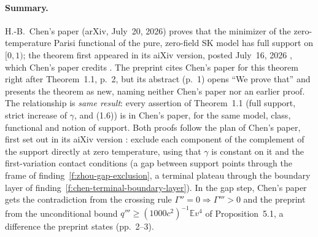 \documentclass[11pt]{article}
\newcommand{\E}{\mathbb{E}}
\newcommand{\ploc}[2]{#1}
\newcommand{\sloc}[2]{\cite[#2]{#1}}
\newcommand{\rel}[1]{\textit{#1}}
\newcounter{finding}
\begin{document}
\paragraph{Summary.}
H.-B.~Chen's paper \sloc{Chen2026-FRSBFullIntervalSupportZeroTemp}{Thm~1.3,
p.~3} (arXiv, July~20, 2026) proves that the minimizer of the
zero-temperature Parisi functional of the pure, zero-field SK model has full
support on $[0,1)$; the theorem first appeared in its aiXiv version, posted
July~16, 2026 \sloc{ChatGPT2026-FRSBFullIntervalSupportZeroTemp}{Thm~1.2,
p.~2}, which Chen's paper credits
\sloc{Chen2026-FRSBFullIntervalSupportZeroTemp}{p.~1; App.~C, p.~38}.
The preprint cites Chen's paper for this theorem right after
\ploc{Theorem~1.1, p.~2}{main.tex:133--135}, but its abstract
(\ploc{p.~1}{main.tex:33--36}) opens ``We prove that'' and presents the
theorem as new, naming neither Chen's paper nor an earlier proof.
The relationship is \rel{same result}: every assertion of
\ploc{Theorem~1.1}{main.tex:119--131} (full support, strict increase of
$\gamma$, and \ploc{(1.6)}{main.tex:125--130}) is in Chen's paper, for the
same model, class, functional and notion of support.
Both proofs follow the plan of Chen's paper, first set out in its aiXiv
version \sloc{ChatGPT2026-FRSBFullIntervalSupportZeroTemp}{pp.~2--3}: exclude
each component of the complement of the support directly at zero
temperature, using that $\gamma$ is constant on it and the first-variation
contact conditions (a gap between support points through the frame of
finding~\ref{f:zhou-gap-exclusion}, a terminal plateau through the boundary
layer of finding~\ref{f:chen-terminal-boundary-layer}).
In the gap step, Chen's paper gets the contradiction from the crossing rule
$\Gamma''=0\Rightarrow\Gamma'''>0$
\sloc{Chen2026-FRSBFullIntervalSupportZeroTemp}{Prop.~4.2, p.~19} and the
preprint from the unconditional bound $q'''\ge(1000c^2)^{-1}\E v^4$ of
\ploc{Proposition~5.1}{curvature.tex:9--20}, a difference the preprint states
(\ploc{pp.~2--3}{main.tex:135--137, 198--203}).
\end{document}
